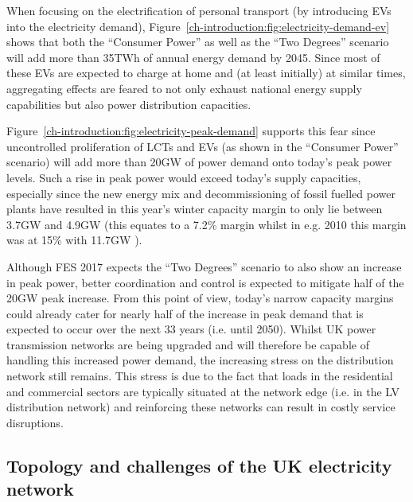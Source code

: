 

When focusing on the electrification of personal transport (by introducing EVs into the electricity demand), Figure~\ref{ch-introduction:fig:electricity-demand-ev} shows that both the ``Consumer Power'' as well as the ``Two Degrees'' scenario will add more than 35TWh of annual energy demand by 2045.
Since most of these EVs are expected to charge at home and (at least initially) at similar times, aggregating effects are feared to not only exhaust national energy supply capabilities but also power distribution capacities.




Figure~\ref{ch-introduction:fig:electricity-peak-demand} supports this fear since uncontrolled proliferation of LCTs and EVs (as shown in the ``Consumer Power'' scenario) will add more than 20GW of power demand onto today's peak power levels.
Such a rise in peak power would exceed today's supply capacities, especially since the new energy mix and decommissioning of fossil fuelled power plants have resulted in this year's winter capacity margin to only lie between 3.7GW and 4.9GW \cite{NationalGrid2017a} (this equates to a 7.2\% margin whilst in e.g. 2010 this margin was at 15\% with 11.7GW \cite{NationalGrid2010}).

Although FES 2017 expects the ``Two Degrees'' scenario to also show an increase in peak power, better coordination and control is expected to mitigate half of the 20GW peak increase.
From this point of view, today's narrow capacity margins could already cater for nearly half of the increase in peak demand that is expected to occur over the next 33 years (i.e. until 2050).
Whilst UK power transmission networks are being upgraded and will therefore be capable of handling this increased power demand, the increasing stress on the distribution network still remains.
This stress is due to the fact that loads in the residential and commercial sectors are typically situated at the network edge (i.e. in the LV distribution network) and reinforcing these networks can result in costly service disruptions.

\subsection{Topology and challenges of the UK electricity network}
\label{ch-introduction:subsec:topology-of-lv-network}

